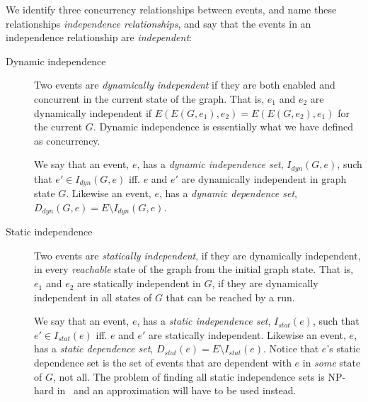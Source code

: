 \documentclass{article}
\begin{document}
			We identify three concurrency relationships between events, and name these relationships \textit{independence relationships}, and say that the events in an independence relationship are \textit{independent}:
			\begin{description}
				\item[Dynamic independence] Two events are \textit{dynamically independent} if they are both enabled and concurrent in the current state of the graph.
				That is, $e_1$ and $e_2$ are dynamically independent if $E(E(G, e_1),e_2)=E(E(G, e_2),e_1)$ for the current $G$.
				Dynamic independence is essentially what we have defined as concurrency.

				We say that an event, $e$, has a \textit{dynamic independence set}, $I_{dyn}(G,e)$, such that $e' \in I_{dyn}(G,e)$ iff. $e$ and $e'$ are dynamically independent in graph state $G$.
				Likewise an event, $e$, has a \textit{dynamic dependence set}, $D_{dyn}(G,e) = E \setminus I_{dyn}(G,e)$.

				\item[Static independence] Two events are \textit{statically independent}, if they are dynamically independent, in every \textit{reachable} state of the graph from the initial graph state.
				That is, $e_1$ and $e_2$ are statically independent in $G$, if they are dynamically independent in all states of $G$ that can be reached by a run.

				We say that an event, $e$, has a \textit{static independence set}, $I_{stat}(e)$, such that $e' \in I_{stat}(e)$ iff. $e$ and $e'$ are statically independent.
				Likewise an event, $e$, has a \textit{static dependence set}, $D_{stat}(e) = E \setminus I_{stat}(e)$.
				Notice that $e$'s static dependence set is the set of events that are dependent with $e$ in \textit{some} state of $G$, not all.
				The problem of finding all static independence sets is NP-hard in~\cite{debois_replication_2017-1} and an approximation will have to be used instead.
			\end{description}
\end{document}
